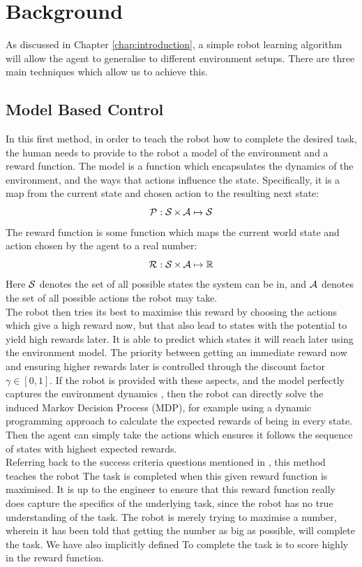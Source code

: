 \chapter{Background}
\label{chap:background}

As discussed in Chapter \ref{chap:introduction}, a simple robot learning algorithm will allow the agent to generalise to different environment setups.
There are three main techniques which allow us to achieve this.

\section{Model Based Control}
\label{sec:model-based-control}
In this first method, in order to teach the robot how to complete the desired task, the human needs to provide to the robot a model of the environment and a reward function. The model is a function which encapsulates the dynamics of the environment, and the ways that actions influence the state. Specifically, it is a map from the current state and chosen action to the resulting next state:
$$\mathcal{P} : \operatorname{\mathcal{S}} \times \operatorname{\mathcal{A}} \mapsto \operatorname{\mathcal{S}}$$
The reward function is some function which maps the current world state and action chosen by the agent to a real number:
$$\operatorname{\mathcal{R}} : \operatorname{\mathcal{S}} \times \operatorname{\mathcal{A}} \mapsto \operatorname{\mathbb{R}}$$
Here $\operatorname{\mathcal{S}}$ denotes the set of all possible states the system can be in, and $\operatorname{\mathcal{A}}$ denotes the set of all possible actions the robot may take.\\

The robot then tries its best to maximise this reward by choosing the actions which give a high reward now, but that also lead to states with the potential to yield high rewards later. It is able to predict which states it will reach later using the environment model. The priority between getting an immediate reward now and ensuring higher rewards later is controlled through the discount factor $\gamma \in [0,1]$. If the robot is provided with these aspects, and the model perfectly captures the environment dynamics , then the robot can directly solve the induced Markov Decision Process (MDP), for example using a dynamic programming approach to calculate the expected rewards of being in every state. Then the agent can simply take the actions which ensures it follows the sequence of states with highest expected rewards.\\

Referring back to the success criteria questions mentioned in , this method teaches the robot  The task is completed when this given reward function is maximised. It is up to the engineer to ensure that this reward function really does capture the specifics of the underlying task, since the robot has no true understanding of the task. The robot is merely trying to maximise a number, wherein it has been told that getting the number as big as possible, will complete the task. We have also implicitly defined  To complete the task is to score highly in the reward function.

